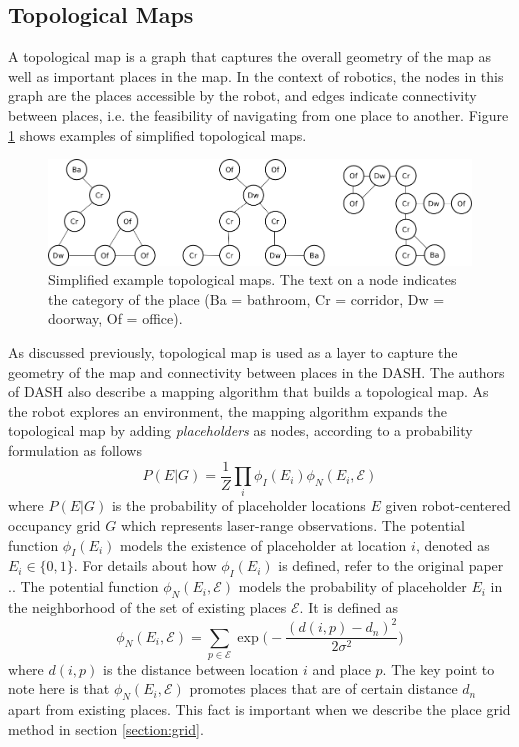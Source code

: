 \documentclass[10pt, titlepage]{article}
\theoremstyle{definition}
\begin{document}
\subsection{Topological Maps}\label{section:topomap}

A topological map is a graph that captures the overall geometry of the map as well as important places in the map. In the context of robotics, the nodes in this graph are the places accessible by the robot, and edges indicate connectivity between places, i.e. the feasibility of navigating from one place to another. Figure \ref{fig:topomap} shows examples of simplified topological maps.
\begin{figure}[!htb]
    \centering
    \captionsetup{width=.8\linewidth}
    \includegraphics[scale=0.5]{images/example_place_maps.png}
    \caption{Simplified example topological maps. The text on a node indicates the category of the place (Ba = bathroom, Cr = corridor, Dw = doorway, Of = office).}
    \label{fig:topomap}
\end{figure}

As discussed previously, topological map is used as a layer to capture the geometry of the map and connectivity between places in the DASH. The authors of DASH \cite{pronobis2017deep} also describe a mapping algorithm that builds a topological map. As the robot explores an environment, the mapping algorithm expands the topological map by adding \textit{placeholders} \cite{pronobis2010representing} as nodes, according to a probability formulation as follows
\begin{equation}\label{eq:p_eg}
  P(E|G) = \frac{1}{Z}\prod_i\phi_I(E_i)\phi_N(E_i, \mathcal{E})
\end{equation}
where $P(E|G)$ is the probability of placeholder locations $E$ given robot-centered occupancy grid $G$ which represents laser-range observations. The potential function $\phi_I(E_i)$ models the existence of placeholder at location $i$, denoted as $E_i\in\{0,1\}$. For details about how $\phi_I(E_i)$ is defined, refer to the original paper \cite{pronobis2017deep}.. The potential function $\phi_N(E_i, \mathcal{E})$ models the probability of placeholder $E_i$ in the neighborhood of the set of existing places $\mathcal{E}$. It is defined as
\begin{equation}\label{eq:phi_n}
  \phi_N(E_i, \mathcal{E}) = \sum_{p\in\mathcal{E}}\exp\Big(-\frac{(d(i,p)-d_n)^2}{2\sigma^2}\Big)
\end{equation}
where $d(i,p)$ is the distance between location $i$ and place $p$. The key point to note here is that $\phi_N(E_i, \mathcal{E})$ promotes places that are of certain distance $d_n$ apart from existing places. This fact is important when we describe the place grid method in section \ref{section:grid}.
\end{document}
